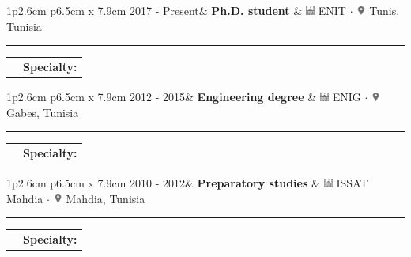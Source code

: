 \documentclass[10pt,a4paper]{article}
\newcommand{\cvevent}[5]
{
\vspace{8pt}
	\begin{tabular*}{1\textwidth}{p{2.6cm} p{6.5cm} x {7.9cm}}
 \textcolor{bgcol}{#1}& \textbf{#2} & \vspace{2.5pt}\textcolor{sectcol}{#3}

	\end{tabular*}
\vspace{-12pt}
\textcolor{softcol}{\hrule}


}
\begin{document}
\cvevent{2017 - Present}{Ph.D. student}{\includegraphics[width=0.3cm, height=0.3cm]{campus.png} ENIT $\cdot$ \includegraphics[width=0.3cm, height=0.3cm]{location2.png} Tunis, Tunisia}
\vspace{6pt}
{
\begin{tabular*}{1\textwidth}{p{2.3cm} p{14.4cm}}
& \vspace{1pt} \textcolor{sectcol}{\textbf{Specialty:}} \hspace{2pt}{Information technology (STIC)} \\
\end{tabular*}
}


%
\cvevent{2012 - 2015}{Engineering degree}{\includegraphics[width=0.3cm, height=0.3cm]{campus.png} ENIG $\cdot$ \includegraphics[width=0.3cm, height=0.3cm]{location2.png} Gabes, Tunisia}
\vspace{6pt}
{
\begin{tabular*}{1\textwidth}{p{2.3cm} p{14.4cm}}
& \vspace{1pt} \textcolor{sectcol}{\textbf{Specialty:}} \hspace{2pt}{Networks \& Communications} \\
\end{tabular*}
}


%
\cvevent{2010 - 2012}{Preparatory studies}{\includegraphics[width=0.3cm, height=0.3cm]{campus.png} ISSAT Mahdia $\cdot$ \includegraphics[width=0.3cm, height=0.3cm]{location2.png} Mahdia, Tunisia}
\vspace{6pt}
{
\begin{tabular*}{1\textwidth}{p{2.3cm} p{14.4cm}}
& \vspace{1pt} \textcolor{sectcol}{\textbf{Specialty:}} \hspace{2pt}{Mathematics \& Physics} \\
\end{tabular*}
}
\end{document}
